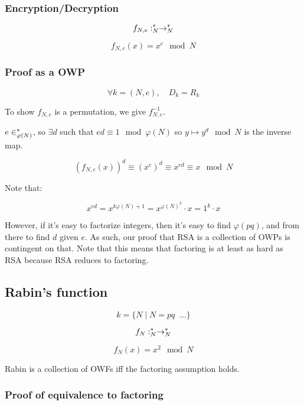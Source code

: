 \documentclass{idc_msc}
\let\ints\relax
\newcommand{\ints}{\ensuremath{\mathbb{Z}}}
\begin{document}
\subsubsection{Encryption/Decryption}

\[
  f_{N,e} : \ints_{N}^* \to \ints_{N}^*
\]

\[
  f_{N,e} (x) = x^{e} \mod N
\]

\subsubsection{Proof as a OWP}

\[
  \forall k = (N, e), \quad D_{k} = R_{k}
\]

To show \(f_{N,e}\) is a permutation, we give \(f^{-1}_{N, e}\).

\( e \in \ints_{\varphi(N)}^* \), so \(\exists d\) such that \(ed \equiv 1 \mod \varphi(N)\) so \(y \mapsto y^d \mod N\) is the inverse map.

\[
  (f_{N, e}(x))^{d} \equiv (x^{e})^d \equiv x^{ed} \equiv x \mod N
\]

Note that:

\[
  x^{ed} = x^{k \varphi(N) + 1} = x^{\varphi(N)^k} \cdot x = 1^k \cdot x
\]

However, if it's easy to factorize integers, then it's easy to find \(\varphi(pq)\), and from there to find \(d\) given \(e\).
As such, our proof that RSA is a collection of OWPs is contingent on that.
Note that this means that factoring is at least as hard as RSA because RSA reduces to factoring.

\subsection{Rabin's function}

\[
  k = \{N \mid N = pq \;\; \ldots\}
\]

\[
  f_{N} : \ints_{N}^* \to \ints_{N}^*
\]

\[
  f_{N} (x) = x^2 \mod N
\]

Rabin is a collection of OWFs iff the factoring assumption holds.

\subsubsection{Proof of equivalence to factoring}
\end{document}
